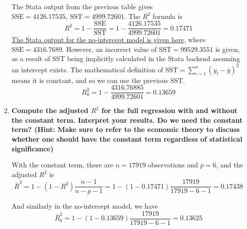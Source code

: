 \documentclass{article}
\begin{document}
\begin{enumerate}[label=\alph*.]
The Stata output from the previous table gives $\text{SSE} = 4126.17535, \ \text{SST} = 4999.72601$. The $R^2$ formula is
$$ R^2 = 1- \frac{\text{SSE}}{\text{SST}} = 1 - \frac{4126.17535}{4999.72601} = 0.17471$$
\hyperlink{nointercept}{The Stata output for the no-intercept model is given here}, where $\text{SSE} = 4316.7689 $.  However, an incorrect value of $\text{SST} = 99529.3551 $ is given, as a result of SST being implicitly calculated in the Stata backend assuming an intercept exists. The mathematical definition of $\text{SST} = \sum_{i=1}^n (y_i-\bar{y})^2$ means it is constant, and so we can use the previous SST.
$$ R_0^2 = 1- \frac{\text{4316.76885}}{\text{4999.72601}} =  0.13659$$



\item \textbf{Compute the adjusted $R^2$ for the full regression with and without the constant term. Interpret your results. Do we need the constant term? (Hint: Make sure to refer to the economic theory to discuss whether one should have the constant term regardless of statistical significance)}

With the constant term, there are $n = 17919$ observations and $p=6$, and the adjusted $R^2$ is
$$ \bar{R}^2 = 1 - (1-R^2) \frac{n-1}{n-p-1} = 1-(1-0.17471)\frac{17919}{17919-6-1} = 0.17438 $$

And similarly in the no-intercept model, we have
$$ \bar{R}_0^2 = 1-(1-0.13659)\frac{17919}{17919-6-1} = 0.13625 $$


\end{enumerate}
\end{document}
